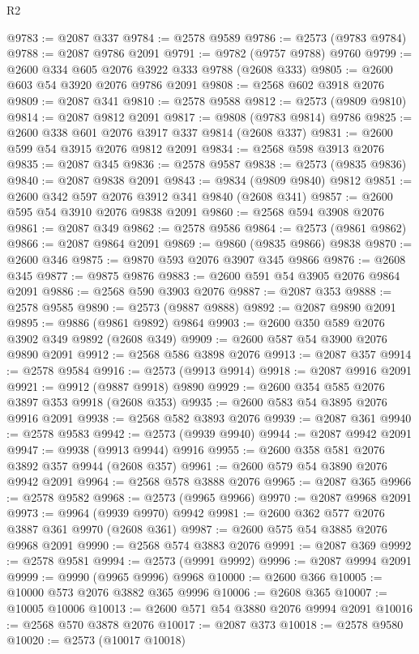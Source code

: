 \begin{lexlean}{R2}
\begin{coremodule}
@9783 := @2087 @337
@9784 := @2578 @9589
@9786 := @2573 (@9783 @9784)
@9788 := @2087 @9786 @2091
@9791 := @9782 (@9757 @9788) @9760
@9799 := @2600 @334 @605 @2076 @3922 @333 @9788 (@2608 @333)
@9805 := @2600 @603 @54 @3920 @2076 @9786 @2091
@9808 := @2568 @602 @3918 @2076
@9809 := @2087 @341
@9810 := @2578 @9588
@9812 := @2573 (@9809 @9810)
@9814 := @2087 @9812 @2091
@9817 := @9808 (@9783 @9814) @9786
@9825 := @2600 @338 @601 @2076 @3917 @337 @9814 (@2608 @337)
@9831 := @2600 @599 @54 @3915 @2076 @9812 @2091
@9834 := @2568 @598 @3913 @2076
@9835 := @2087 @345
@9836 := @2578 @9587
@9838 := @2573 (@9835 @9836)
@9840 := @2087 @9838 @2091
@9843 := @9834 (@9809 @9840) @9812
@9851 := @2600 @342 @597 @2076 @3912 @341 @9840 (@2608 @341)
@9857 := @2600 @595 @54 @3910 @2076 @9838 @2091
@9860 := @2568 @594 @3908 @2076
@9861 := @2087 @349
@9862 := @2578 @9586
@9864 := @2573 (@9861 @9862)
@9866 := @2087 @9864 @2091
@9869 := @9860 (@9835 @9866) @9838
@9870 := @2600 @346
@9875 := @9870 @593 @2076 @3907 @345 @9866
@9876 := @2608 @345
@9877 := @9875 @9876
@9883 := @2600 @591 @54 @3905 @2076 @9864 @2091
@9886 := @2568 @590 @3903 @2076
@9887 := @2087 @353
@9888 := @2578 @9585
@9890 := @2573 (@9887 @9888)
@9892 := @2087 @9890 @2091
@9895 := @9886 (@9861 @9892) @9864
@9903 := @2600 @350 @589 @2076 @3902 @349 @9892 (@2608 @349)
@9909 := @2600 @587 @54 @3900 @2076 @9890 @2091
@9912 := @2568 @586 @3898 @2076
@9913 := @2087 @357
@9914 := @2578 @9584
@9916 := @2573 (@9913 @9914)
@9918 := @2087 @9916 @2091
@9921 := @9912 (@9887 @9918) @9890
@9929 := @2600 @354 @585 @2076 @3897 @353 @9918 (@2608 @353)
@9935 := @2600 @583 @54 @3895 @2076 @9916 @2091
@9938 := @2568 @582 @3893 @2076
@9939 := @2087 @361
@9940 := @2578 @9583
@9942 := @2573 (@9939 @9940)
@9944 := @2087 @9942 @2091
@9947 := @9938 (@9913 @9944) @9916
@9955 := @2600 @358 @581 @2076 @3892 @357 @9944 (@2608 @357)
@9961 := @2600 @579 @54 @3890 @2076 @9942 @2091
@9964 := @2568 @578 @3888 @2076
@9965 := @2087 @365
@9966 := @2578 @9582
@9968 := @2573 (@9965 @9966)
@9970 := @2087 @9968 @2091
@9973 := @9964 (@9939 @9970) @9942
@9981 := @2600 @362 @577 @2076 @3887 @361 @9970 (@2608 @361)
@9987 := @2600 @575 @54 @3885 @2076 @9968 @2091
@9990 := @2568 @574 @3883 @2076
@9991 := @2087 @369
@9992 := @2578 @9581
@9994 := @2573 (@9991 @9992)
@9996 := @2087 @9994 @2091
@9999 := @9990 (@9965 @9996) @9968
@10000 := @2600 @366
@10005 := @10000 @573 @2076 @3882 @365 @9996
@10006 := @2608 @365
@10007 := @10005 @10006
@10013 := @2600 @571 @54 @3880 @2076 @9994 @2091
@10016 := @2568 @570 @3878 @2076
@10017 := @2087 @373
@10018 := @2578 @9580
@10020 := @2573 (@10017 @10018)

\end{coremodule}
\end{lexlean}
